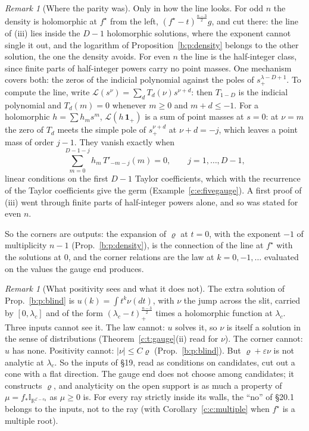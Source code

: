 \documentclass[11pt]{article}
\newcommand{\cE}{\mathcal E}
\newcommand{\one}{\mathbf 1}
\newcommand{\Lch}{\mathbb I_{\mathbb R^{\cE-e_0}}}
\theoremstyle{plain}
\theoremstyle{definition}
\theoremstyle{remark}
\newtheorem{remark}[proposition]{Remark}
\begin{document}
\begin{remark}[Where the parity was]\label{c:r:parity}\label{d:r:parity}
Only in how the line looks. For odd $n$ the density is holomorphic at $f^\star$ from the left, $(f^\star-t)^{\frac{n-3}2}g$, and cut there: the line of (iii) lies inside the $D-1$ holomorphic solutions, where the exponent cannot single it out, and the logarithm of Proposition~\ref{b:p:density} belongs to the other solution, the one the density avoids. For even $n$ the line is the half-integer class, since finite parts of half-integer powers carry no point masses. One mechanism covers both: the zeros of the indicial polynomial against the poles of $s_+^{\lambda-D+1}$. To compute the line, write $\mathcal L(s^\nu)=\sum_dT_d(\nu)s^{\nu+d}$: then $T_{1-D}$ is the indicial polynomial and $T_d(m)=0$ whenever $m\ge0$ and $m+d\le-1$. For a holomorphic $h=\sum h_ms^m$, $\mathcal L(h\,\one_+)$ is a sum of point masses at $s=0$: at $\nu=m$ the zero of $T_d$ meets the simple pole of $s_+^{\nu+d}$ at $\nu+d=-j$, which leaves a point mass of order $j-1$. They vanish exactly when
\[
\sum_{m=0}^{D-1-j}h_m\,T'_{-m-j}(m)=0,\qquad j=1,\dots,D-1,
\]
linear conditions on the first $D-1$ Taylor coefficients, which with the recurrence of the Taylor coefficients give the germ (Example~\ref{c:e:fivegauge}). A first proof of (iii) went through finite parts of half-integer powers alone, and so was stated for even $n$.
\end{remark}


\noindent So the corners are outputs: the expansion of $\varrho$ at $t=0$, with the exponent $-1$ of multiplicity $n-1$ (Prop.~\ref{b:p:density}), is the connection of the line at $f^\star$ with the solutions at $0$, and the corner relations are the law at $k=0,-1,\dots$ evaluated on the values the gauge end produces.

\begin{remark}[What positivity sees and what it does not]\label{c:r:sees}
The extra solution of Prop.~\ref{b:p:blind} is $u(k)=\int t^k\nu(dt)$, with $\nu$ the jump across the slit, carried by $[0,\lambda_c]$ and of the form $(\lambda_c-t)_+^{\frac{n-3}2}$ times a holomorphic function at $\lambda_c$. Three inputs cannot see it. The law cannot: $u$ solves it, so $\nu$ is itself a solution in the sense of distributions (Theorem~\ref{c:t:gauge}(ii) read for $\nu$). The corner cannot: $u$ has none. Positivity cannot: $|\nu|\le C\varrho$ (Prop.~\ref{b:p:blind}). But $\varrho+\varepsilon\nu$ is not analytic at $\lambda_c$. So the inputs of \S19, read as conditions on candidates, cut out a cone with a flat direction. The gauge end does not choose among candidates; it constructs $\varrho$, and analyticity on the open support is as much a property of $\mu=f_*\Lch$ as $\mu\ge0$ is. For every ray strictly inside its walls, the ``no'' of \S20.1 belongs to the inputs, not to the ray (with Corollary~\ref{c:c:multiple} when $f^\star$ is a multiple root).
\end{remark}
\end{document}
